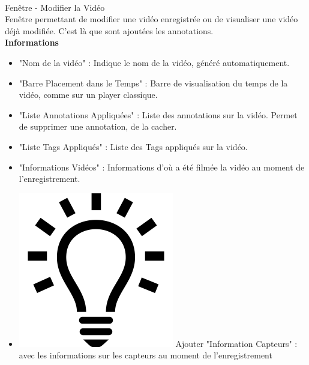 \documentclass[11pt,french,a4paper]{report}
\begin{document}
\begin{multicols}{2}
\begin{small}
\columnbreak

\dotfill \\

\Large Fenêtre - Modifier la Vidéo\normalsize \\
    Fenêtre permettant de modifier une vidéo enregistrée ou de visualiser une vidéo déjà modifiée.
    C'est là que sont ajoutées les annotations. \\
\large \textbf{Informations}\normalsize
     \begin{itemize}[label=, leftmargin=*,parsep=0cm,itemsep=0cm,topsep=0cm]
        \item "Nom de la vidéo" : Indique le nom de la vidéo, généré automatiquement.
        \item "Barre Placement dans le Temps" : Barre de visualisation du temps de la vidéo, comme sur un player classique.
        \item "Liste Annotations Appliquées" : Liste des annotations sur la vidéo. Permet de supprimer une annotation, de
        la cacher.
        \item "Liste Tags Appliqués" : Liste des Tags appliqués sur la vidéo.
        \item "Informations Vidéos" : Informations d'où a été filmée la vidéo au moment de l'enregistrement.
        \item \includegraphics[scale=0.05]{../images/logo/logo_ampoule} Ajouter "Information Capteurs" :
            avec les informations sur les capteurs au moment de l'enregistrement 
    \end{itemize}
    

\end{small}
\end{multicols}
\end{document}
